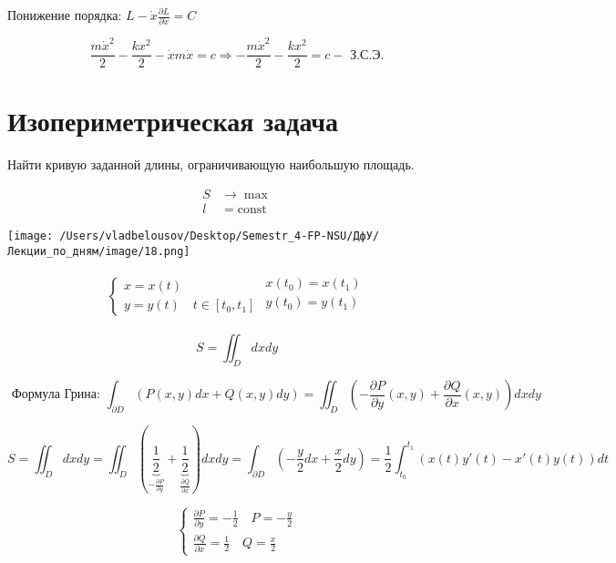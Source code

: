 \documentclass[12pt, a4paper]{report}
\begin{document}
Понижение порядка: \( \displaystyle  L - \dot{x } \frac{\partial L}{\partial  \dot{x} } = C  \) 

\[ \frac{m \dot{x }  ^2 }{2 } - \frac{k x ^2 }{2 } - \dot{x } m \dot{x } = c \Rightarrow -\frac{m \dot{ x } ^2 }{2 } - \frac{k x ^2  }{2}  =c  - \text{ З.С.Э.}   \] 

\section{Изопериметрическая задача }

Найти кривую заданной длины, ограничивающую наибольшую площадь.

\[ \begin{aligned}
    S &\to  \max  \\ 
    l &= \mathrm{const}  
\end{aligned} \] 

\begin{center}
    \texttt{[image: /Users/vladbelousov/Desktop/Semestr\_4-FP-NSU/ДфУ/Лекции\_по\_дням/image/18.png]}
\end{center}

\[\begin{aligned}
    \begin{cases}
        x = x(t) \\ 
        y = y(t) \quad  t \in [ t_0 ,t_1]
        \end{cases}
    \begin{aligned}
        x(t_0 )=x(t_1) \\ 
        y(t_0 )=y(t_1) \\  
    \end{aligned}
\end{aligned} \]

\[ S = \iint_D dx dy   \] 

\[\text{ Формула Грина: }  \int_{ \partial D} \left( P(x,y )dx +Q(x,y )dy  \right) =\iint _D \left( - \frac{\partial P }{ \partial  y } (x,y ) + \frac{\partial Q}{\partial x }(x,y)   \right) dx dy\] 

\[ S = \iint_D dx dy = \iint_D \left(\underbrace{ \frac{1}{2 }}_{- \frac{\partial  P}{\partial y} } + \underbrace{ \frac{1}{2 }}_{ \frac{\partial  Q}{\partial x} }       \right)dx dy = \int_{ \partial  D } \left(  - \frac{y}{2 } dx + \frac{x}{2 } dy \right)  =\frac{1}{2 } \int_{t_0 }^{t_1} (x(t )y ' (t )- x' (t )y (t))dt  \] 

\[ \begin{cases}
\displaystyle \frac{\partial P } {\partial y } = -\frac{1}{2 }  \quad   P = - \frac{y}{2}  \\
\displaystyle \frac{\partial Q }{\partial x } = \frac{1}{2 } \quad  Q = \frac{x}{2}   
\end{cases} \] 
\end{document}
